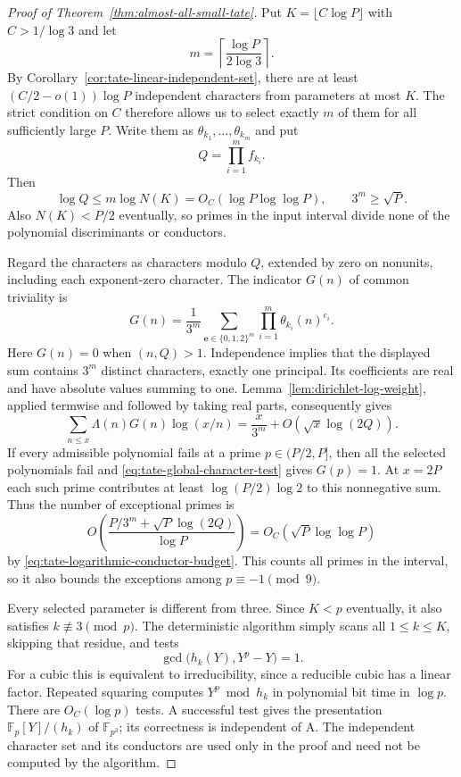 \documentclass[11pt]{article}
\theoremstyle{definition}
\theoremstyle{remark}
\begin{document}
\begin{proof}[Proof of Theorem~\ref{thm:almost-all-small-tate}]
Put $K=\lfloor C\log P\rfloor$ with $C>1/\log3$ and let
\[
 m=\left\lceil\frac{\log P}{2\log3}\right\rceil.
\]
By Corollary~\ref{cor:tate-linear-independent-set}, there are at
least $(C/2-o(1))\log P$ independent characters from parameters
at most $K$.  The strict condition on $C$ therefore allows us
to select exactly $m$ of them for all sufficiently large $P$.
Write them as $\theta_{k_1},\ldots,\theta_{k_m}$ and put
\[
 Q=\prod_{i=1}^m f_{k_i}.
\]
Then
\begin{equation}\label{eq:tate-logarithmic-conductor-budget}
 \log Q\le m\log N(K)
 =O_C(\log P\log\log P),\qquad 3^m\ge\sqrt P.
\end{equation}
Also $N(K)<P/2$ eventually, so primes in the input interval
divide none of the polynomial discriminants or conductors.

Regard the characters as characters modulo $Q$, extended by
zero on nonunits, including each exponent-zero character.
The indicator $G(n)$ of common triviality is
\[
 G(n)=\frac1{3^m}
       \sum_{\boldsymbol e\in\{0,1,2\}^m}
         \prod_{i=1}^m\theta_{k_i}(n)^{e_i}.
\]
Here $G(n)=0$ when $(n,Q)>1$.  Independence implies that
the displayed sum contains $3^m$ distinct characters, exactly
one principal.  Its coefficients are real and have absolute
values summing to one.  Lemma~\ref{lem:dirichlet-log-weight},
applied termwise and followed by taking real parts, consequently
gives
\[
 \sum_{n\le x}\Lambda(n)G(n)\log(x/n)
 =\frac{x}{3^m}+O\!\left(\sqrt x\log(2Q)\right).
\]
If every admissible polynomial fails at a prime
$p\in(P/2,P]$, then all the selected polynomials fail and
\eqref{eq:tate-global-character-test} gives $G(p)=1$.
At $x=2P$ each such prime contributes at least
$\log(P/2)\log2$ to this nonnegative sum.  Thus the number
of exceptional primes is
\[
 O\!\left(
 \frac{P/3^m+\sqrt P\log(2Q)}{\log P}\right)
 =O_C(\sqrt P\log\log P)
\]
by \eqref{eq:tate-logarithmic-conductor-budget}.  This counts
all primes in the interval, so it also bounds the exceptions
among $p\equiv-1\pmod9$.

Every selected parameter is different from three.  Since
$K<p$ eventually, it also satisfies $k\not\equiv3\pmod p$.
The deterministic algorithm simply scans all $1\le k\le K$,
skipping that residue, and tests
\[
 \gcd\bigl(h_k(Y),Y^p-Y\bigr)=1.
\]
For a cubic this is equivalent to irreducibility, since a
reducible cubic has a linear factor.  Repeated squaring computes
$Y^p\bmod h_k$ in polynomial bit time in $\log p$.
There are $O_C(\log p)$ tests.  A successful test gives the
presentation $\mathbb F_p[Y]/(h_k)$ of $\mathbb F_{p^3}$;
its correctness is independent of A.  The independent character
set and its conductors are used only in the proof and need not
be computed by the algorithm.
\end{proof}
\end{document}
